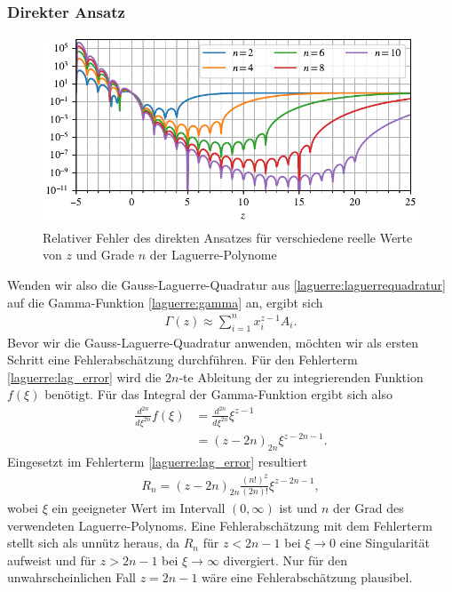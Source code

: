 \subsubsection{Direkter Ansatz}
%
\begin{figure}
\centering
% 
\includegraphics{papers/laguerre/images/rel_error_simple.pdf}
\caption{Relativer Fehler des direkten Ansatzes
für verschiedene reelle Werte von $z$ und Grade $n$ der
Laguerre-Polynome}%
\label{laguerre:fig:rel_error_simple}
\end{figure}
Wenden wir also die Gauss-Laguerre-Quadratur aus
\eqref{laguerre:laguerrequadratur} auf die Gamma-Funktion
\eqref{laguerre:gamma} an,
ergibt sich
\begin{align}
\Gamma(z)
\approx
\sum_{i=1}^n x_i^{z-1} A_i
\label{laguerre:naive_lag}
.
\end{align}
Bevor wir die Gauss-Laguerre-Quadratur anwenden,
möchten wir als ersten Schritt eine Fehlerabschätzung durchführen.
Für den Fehlerterm \eqref{laguerre:lag_error} wird die $2n$-te Ableitung
der zu integrierenden Funktion $f(\xi)$ benötigt.
Für das Integral der Gamma-Funktion ergibt sich also
\begin{align*}
\frac{d^{2n}}{d\xi^{2n}} f(\xi)
 & =
\frac{d^{2n}}{d\xi^{2n}} \xi^{z-1}
\\
 & =
(z - 2n)_{2n} \xi^{z - 2n - 1}
.
\end{align*}
Eingesetzt im Fehlerterm \eqref{laguerre:lag_error} resultiert
\begin{align}
R_n
=
(z - 2n)_{2n} \frac{(n!)^2}{(2n)!} \xi^{z-2n-1}
,
\label{laguerre:gamma_err_simple}
\end{align}
wobei $\xi$ ein geeigneter Wert im Intervall $(0, \infty)$ ist
und $n$ der Grad des verwendeten Laguerre-Polynoms.
Eine Fehlerabschätzung mit dem Fehlerterm stellt sich als unnütz heraus,
da $R_n$ für $z < 2n - 1$ bei $\xi \rightarrow 0$ eine Singularität aufweist
und für $z > 2n - 1$ bei $\xi \rightarrow \infty$ divergiert.
Nur für den unwahrscheinlichen Fall $ z = 2n - 1$
wäre eine Fehlerabschätzung plausibel.

